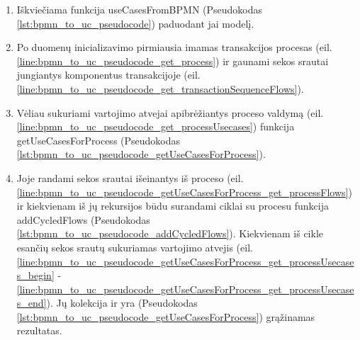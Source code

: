 \renewcommand{\lstlistingname}{Pseudokodas}%
\renewcommand{\lstlistlistingname}{Pseudokodo fragmentai}%
\begin{enumerate}
	\item Iškviečiama funkcija useCasesFromBPMN (Pseudokodas \ref{lst:bpmn_to_uc_pseudocode}) paduodant jai \BPMN{} modelį.

	

	\item Po duomenų inicializavimo pirmiausia imamas transakcijos procesas (eil. \ref{line:bpmn_to_uc_pseudocode_get_process}) ir gaunami sekos srautai jungiantys komponentus transakcijoje (eil. \ref{line:bpmn_to_uc_pseudocode_get_transactionSequenceFlows}).
	\item Vėliau sukuriami vartojimo atvejai apibrėžiantys proceso valdymą (eil. \ref{line:bpmn_to_uc_pseudocode_get_processUsecases}) funkcija getUseCasesForProcess (Pseudokodas  \ref{lst:bpmn_to_uc_pseudocode_getUseCasesForProcess}).

	

	\item Joje randami sekos srautai išeinantys iš proceso (eil. \ref{line:bpmn_to_uc_pseudocode_getUseCasesForProcess_get_processFlows}) ir kiekvienam iš jų rekursijos būdu surandami ciklai su procesu funkcija addCycledFlows (Pseudokodas  \ref{lst:bpmn_to_uc_pseudocode_addCycledFlows}). Kiekvienam iš cikle esančių sekos srautų sukuriamas vartojimo atvejis (eil. \ref{line:bpmn_to_uc_pseudocode_getUseCasesForProcess_get_processUsecases_begin} - \ref{line:bpmn_to_uc_pseudocode_getUseCasesForProcess_get_processUsecases_end}). Jų kolekcija ir yra (Pseudokodas  \ref{lst:bpmn_to_uc_pseudocode_getUseCasesForProcess}) grąžinamas rezultatas.

	


\end{enumerate}
